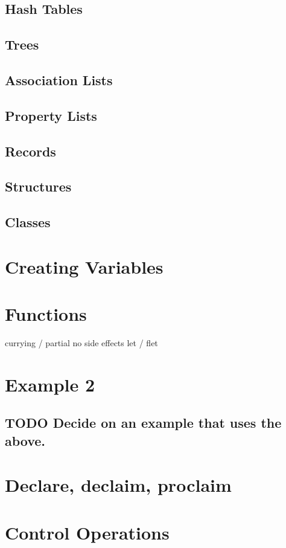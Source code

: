 \documentclass[11pt]{article}
\begin{document}
\subsection{Hash Tables}
\label{sec-5-3}
\subsection{Trees}
\label{sec-5-4}
\subsection{Association Lists}
\label{sec-5-5}
\subsection{Property Lists}
\label{sec-5-6}
\subsection{Records}
\label{sec-5-7}
\subsection{Structures}
\label{sec-5-8}
\subsection{Classes}
\label{sec-5-9}
\section{Creating Variables}
\label{sec-6}
\section{Functions}
\label{sec-7}
currying / partial
no side effects
let / flet 
\section{Example 2}
\label{sec-8}
\subsection{{\bfseries\sffamily TODO} Decide on an example that uses the above.}
\label{sec-8-1}
\section{Declare, declaim, proclaim}
\label{sec-9}
\section{Control Operations}
\label{sec-10}
\end{document}
